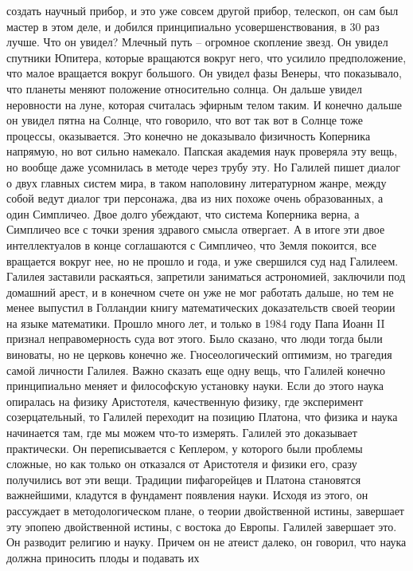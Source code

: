 \documentclass[a4paper, 12pt]{article}
\begin{document}
создать научный прибор, и это уже совсем другой прибор, телескоп, он сам 
был мастер в этом деле, и добился принципиально усовершенствования, в 30 
раз лучше. Что он увидел? Млечный путь -- огромное скопление звезд. Он 
увидел спутники Юпитера, которые вращаются вокруг него, что усилило 
предположение, что малое вращается вокруг большого. Он увидел фазы 
Венеры, что показывало, что планеты меняют положение относительно 
солнца. Он дальше увидел неровности на луне, которая считалась эфирным 
телом таким. И конечно дальше он увидел пятна на Солнце, что говорило, 
что вот так вот в Солнце тоже процессы, оказывается. Это конечно не 
доказывало физичность Коперника напрямую, но вот сильно намекало. 
Папская академия наук проверяла эту вещь, но вообще даже усомнилась 
в методе через трубу эту. Но Галилей пишет диалог о двух главных систем 
мира, в таком наполовину литературном жанре, между собой ведут диалог 
три персонажа, два из них похоже очень образованных, а один Симпличео. 
Двое долго убеждают, что система Коперника верна, а Симпличео все 
с точки зрения здравого смысла отвергает. А в итоге эти двое 
интеллектуалов в конце соглашаются с Симпличео, что Земля покоится, все 
вращается вокруг нее, но не прошло и года, и уже свершился суд над 
Галилеем. Галилея заставили раскаяться, запретили заниматься 
астрономией, заключили под домашний арест, и в конечном счете он уже не 
мог работать дальше, но тем не менее выпустил в Голландии книгу 
математических доказательств своей теории на языке математики. Прошло 
много лет, и только в 1984 году Папа Иоанн II признал неправомерность 
суда вот этого. Было сказано, что люди тогда были виноваты, но не 
церковь конечно же. Гносеологический оптимизм, но трагедия самой 
личности Галилея. Важно сказать еще одну вещь, что Галилей конечно 
принципиально меняет и философскую установку науки. Если до этого наука 
опиралась на физику Аристотеля, качественную физику, где эксперимент 
созерцательный, то Галилей переходит на позицию Платона, что физика 
и наука начинается там, где мы можем что-то измерять. Галилей это 
доказывает практически. Он переписывается с Кеплером, у которого были 
проблемы сложные, но как только он отказался от Аристотеля и физики его, 
сразу получились вот эти вещи. Традиции пифагорейцев и Платона 
становятся важнейшими, кладутся в фундамент появления науки. Исходя из 
этого, он рассуждает в методологическом плане, о теории двойственной 
истины, завершает эту эпопею двойственной истины, с востока до Европы. 
Галилей завершает это. Он разводит религию и науку. Причем он не атеист 
далеко, он говорил, что наука должна приносить плоды и подавать их 
\end{document}
